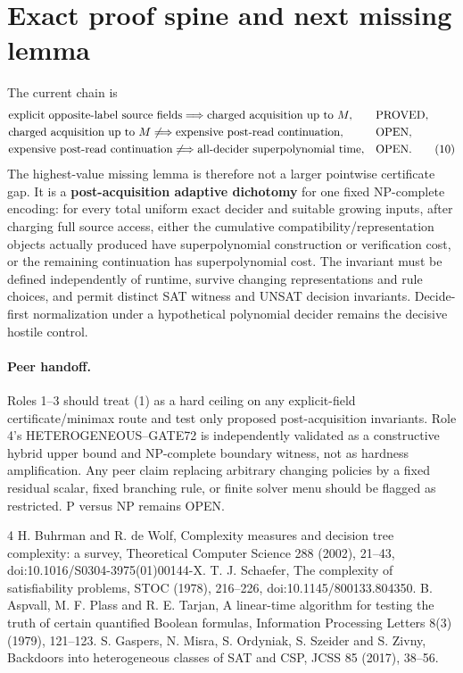 \documentclass[11pt]{article}
\begin{document}
\section{Exact proof spine and next missing lemma}
The current chain is
\begin{align}
&\text{explicit opposite-label source fields}
  \Longrightarrow \text{charged acquisition up to }M,
  &&\text{PROVED},\notag\\
&\text{charged acquisition up to }M
  \not\Longrightarrow \text{expensive post-read continuation},
  &&\text{OPEN},\notag\\
&\text{expensive post-read continuation}
  \not\Longrightarrow \text{all-decider superpolynomial time},
  &&\text{OPEN}.
\tag{10}
\end{align}
The highest-value missing lemma is therefore not a larger pointwise
certificate gap.  It is a \textbf{post-acquisition adaptive dichotomy} for one
fixed NP-complete encoding: for every total uniform exact decider and suitable
growing inputs, after charging full source access, either the cumulative
compatibility/representation objects actually produced have superpolynomial
construction or verification cost, or the remaining continuation has
superpolynomial cost.  The invariant must be defined independently of runtime,
survive changing representations and rule choices, and permit distinct SAT
witness and UNSAT decision invariants.  Decide-first normalization under a
hypothetical polynomial decider remains the decisive hostile control.

\paragraph{Peer handoff.}
Roles 1--3 should treat (1) as a hard ceiling on any explicit-field
certificate/minimax route and test only proposed post-acquisition invariants.
Role 4's HETEROGENEOUS--GATE72 is independently validated as a constructive
hybrid upper bound and NP-complete boundary witness, not as hardness
amplification.  Any peer claim replacing arbitrary changing policies by a
fixed residual scalar, fixed branching rule, or finite solver menu should be
flagged as restricted.  P versus NP remains OPEN.

\begin{thebibliography}{4}
 H. Buhrman and R. de Wolf, Complexity measures and decision
tree complexity: a survey, Theoretical Computer Science 288 (2002), 21--43,
doi:10.1016/S0304-3975(01)00144-X.
 T. J. Schaefer, The complexity of satisfiability problems,
STOC (1978), 216--226, doi:10.1145/800133.804350.
 B. Aspvall, M. F. Plass and R. E. Tarjan, A linear-time
algorithm for testing the truth of certain quantified Boolean formulas,
Information Processing Letters 8(3) (1979), 121--123.
 S. Gaspers, N. Misra, S. Ordyniak, S. Szeider and
S. Zivny, Backdoors into heterogeneous classes of SAT and CSP,
JCSS 85 (2017), 38--56.
\end{thebibliography}
\end{document}
